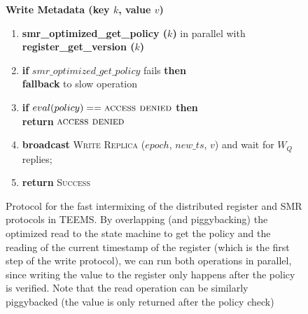 \begin{figure}[t]
  \begin{small}
    \textbf{Write Metadata (key $k$, value $v$)}

    \begin{enumerate}[itemsep=0pt,parsep=0pt]

        \item \textbf{smr\_optimized\_get\_policy ($k$)} in
            parallel with \textbf{register\_get\_version ($k$)}

        \item \textbf{if} $smr\_optimized\_get\_policy$ fails \textbf{then}\\
            \tabto{.5cm}    \textbf{fallback} to slow operation

        \item \textbf{if} $eval(policy) == \textsc{access denied}$ \textbf{then}\\
            \tabto{.5cm}    \textbf{return} $\textsc{access denied}$

        \item \textbf{broadcast} \textsc{Write Replica} ($epoch$, $new\_ts$, $v$) and wait for $W_Q$ replies;

        \item \textbf{return} \textsc{Success}
    \end{enumerate}

  \end{small}
    \caption{Protocol for the fast intermixing of the distributed
    register and \ac{SMR} protocols in \ac{TEEMS}.  By overlapping
    (and piggybacking) the optimized read to the state machine to
    get the policy and the reading of the current timestamp of
    the register (which is the first step of the write protocol),
    we can run both operations in parallel, since writing the
    value to the register only happens after the policy is
    verified. Note that the read operation can be similarly
    piggybacked (the value is only returned after the policy
    check)}\label{fig:teems_fast_mixing}
\end{figure}
